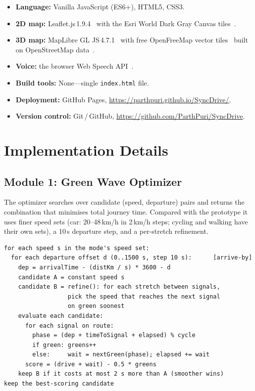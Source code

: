 \documentclass[12pt,a4paper]{report}
\begin{document}
\begin{itemize}
  \item \textbf{Language:} Vanilla JavaScript (ES6+), HTML5, CSS3.
  \item \textbf{2D map:} Leaflet.js\,1.9.4~\cite{Leaflet26} with the Esri
        World Dark Gray Canvas tiles~\cite{Esri26}.
  \item \textbf{3D map:} MapLibre GL JS\,4.7.1~\cite{MapLibre26} with free
        OpenFreeMap vector tiles~\cite{OpenFreeMap26} built on
        OpenStreetMap data~\cite{OSM26}.
  \item \textbf{Voice:} the browser Web Speech API~\cite{WebSpeech26}.
  \item \textbf{Build tools:} None---single \texttt{index.html} file.
  \item \textbf{Deployment:} GitHub Pages,
        \url{https://parthpuri.github.io/SyncDrive/}.
  \item \textbf{Version control:} Git\,/\,GitHub,
        \url{https://github.com/ParthPuri/SyncDrive}.
\end{itemize}

\section{Implementation Details}

\subsection{Module 1: Green Wave Optimizer}

The optimizer searches over candidate (speed, departure) pairs and returns the
combination that minimises total journey time. Compared with the prototype it
uses finer speed sets (car: 20--48\,km/h in 2\,km/h steps; cycling and walking
have their own sets), a 10\,s departure step, and a per-stretch refinement.

\begin{lstlisting}
for each speed s in the mode's speed set:
  for each departure offset d (0..1500 s, step 10 s):      [arrive-by]
    dep = arrivalTime - (distKm / s) * 3600 - d
    candidate A = constant speed s
    candidate B = refine(): for each stretch between signals,
                  pick the speed that reaches the next signal
                  on green soonest
    evaluate each candidate:
      for each signal on route:
        phase = (dep + timeToSignal + elapsed) % cycle
        if green: greens++
        else:     wait = nextGreen(phase); elapsed += wait
      score = (drive + wait) - 0.5 * greens
    keep B if it costs at most 2 s more than A (smoother wins)
keep the best-scoring candidate
\end{lstlisting}
\end{document}
